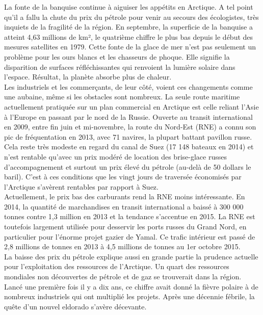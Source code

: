 \documentclass[8pt]{article}
\begin{document}
La fonte de la banquise continue à aiguiser les appétits en Arctique. A tel point qu’il a fallu la chute du prix du pétrole pour venir au secours des écologistes, très inquiets de la fragilité de la région. En septembre, la superficie de la banquise a atteint 4,63 millions de km², le quatrième chiffre le plus bas depuis le début des mesures satellites en 1979. Cette fonte de la glace de mer n’est pas seulement un problème pour les ours blancs et les chasseurs de phoque. Elle signifie la disparition de surfaces réfléchissantes qui renvoient la lumière solaire dans l’espace. Résultat, la planète absorbe plus de chaleur.\\

Les industriels et les commerçants, de leur côté, voient ces changements comme une aubaine, même si les obstacles sont nombreux. La seule route maritime actuellement pratiquée sur un plan commercial en Arctique est celle reliant l’Asie à l’Europe en passant par le nord de la Russie. Ouverte au transit international en 2009, entre fin juin et mi-novembre, la route du Nord-Est (RNE) a connu son pic de fréquentation en 2013, avec 71 navires, la plupart battant pavillon russe. Cela reste très modeste en regard du canal de Suez (17 148 bateaux en 2014) et n’est rentable qu’avec un prix modéré de location des brise-glace russes d’accompagnement et surtout un prix élevé du pétrole (au-delà de 50 dollars le baril). C’est à ces conditions que les vingt jours de traversée économisés par l’Arctique s’avèrent rentables par rapport à Suez. \\

Actuellement, le prix bas des carburants rend la RNE moins intéressante. En 2014, la quantité de marchandises en transit international a baissé à 300 000 tonnes contre 1,3 million en 2013 et la tendance s’accentue en 2015. La RNE est toutefois largement utilisée pour desservir les ports russes du Grand Nord, en particulier pour l’énorme projet gazier de Yamal. Ce trafic intérieur est passé de 2,8 millions de tonnes en 2013 à 4,5 millions de tonnes au 1er octobre 2015.\\

La baisse des prix du pétrole explique aussi en grande partie la prudence actuelle pour l’exploitation des ressources de l’Arctique. Un quart des ressources mondiales non découvertes de pétrole et de gaz se trouverait dans la région. Lancé une première fois il y a dix ans, ce chiffre avait donné la fièvre polaire à de nombreux industriels qui ont multiplié les projets. Après une décennie fébrile, la quête d’un nouvel eldorado s’avère décevante.\\
\end{document}
